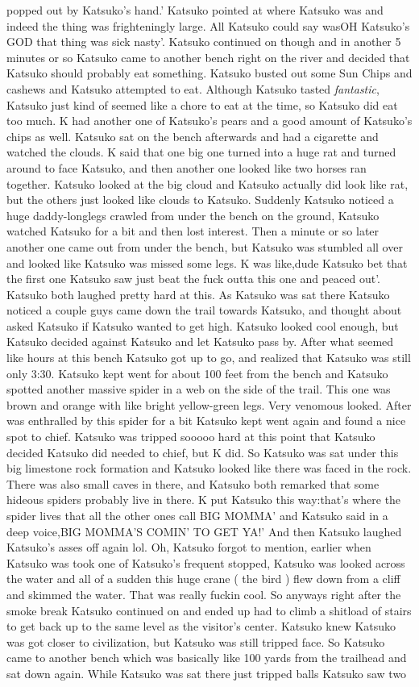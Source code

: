 \documentclass[12pt]{book}
\begin{document}
popped out by Katsuko's hand.' Katsuko pointed at where Katsuko was and indeed the thing was frighteningly large. All Katsuko could say wasOH Katsuko's GOD that thing was sick nasty'. Katsuko continued on though and in another 5 minutes or so Katsuko came to another bench right on the river and decided that Katsuko should probably eat something. Katsuko busted out some Sun Chips and cashews and Katsuko attempted to eat. Although Katsuko tasted \emph{fantastic}, Katsuko just kind of seemed like a chore to eat at the time, so Katsuko did eat too much. K had another one of Katsuko's pears and a good amount of Katsuko's chips as well. Katsuko sat on the bench afterwards and had a cigarette and watched the clouds. K said that one big one turned into a huge rat and turned around to face Katsuko, and then another one looked like two horses ran together. Katsuko looked at the big cloud and Katsuko actually did look like rat, but the others just looked like clouds to Katsuko. Suddenly Katsuko noticed a huge daddy-longlegs crawled from under the bench on the ground, Katsuko watched Katsuko for a bit and then lost interest. Then a minute or so later another one came out from under the bench, but Katsuko was stumbled all over and looked like Katsuko was missed some legs. K was like,dude Katsuko bet that the first one Katsuko saw just beat the fuck outta this one and peaced out'. Katsuko both laughed pretty hard at this. As Katsuko was sat there Katsuko noticed a couple guys came down the trail towards Katsuko, and thought about asked Katsuko if Katsuko wanted to get high. Katsuko looked cool enough, but Katsuko decided against Katsuko and let Katsuko pass by. After what seemed like hours at this bench Katsuko got up to go, and realized that Katsuko was still only 3:30. Katsuko kept went for about 100 feet from the bench and Katsuko spotted another massive spider in a web on the side of the trail. This one was brown and orange with like bright yellow-green legs. Very venomous looked. After was enthralled by this spider for a bit Katsuko kept went again and found a nice spot to chief. Katsuko was tripped sooooo hard at this point that Katsuko decided Katsuko did needed to chief, but K did. So Katsuko was sat under this big limestone rock formation and Katsuko looked like there was faced in the rock. There was also small caves in there, and Katsuko both remarked that some hideous spiders probably live in there. K put Katsuko this way:that's where the spider lives that all the other ones call BIG MOMMA' and Katsuko said in a deep voice,BIG MOMMA'S COMIN' TO GET YA!' And then Katsuko laughed Katsuko's asses off again lol. Oh, Katsuko forgot to mention, earlier when Katsuko was took one of Katsuko's frequent stopped, Katsuko was looked across the water and all of a sudden this huge crane ( the bird ) flew down from a cliff and skimmed the water. That was really fuckin cool. So anyways right after the smoke break Katsuko continued on and ended up had to climb a shitload of stairs to get back up to the same level as the visitor's center. Katsuko knew Katsuko was got closer to civilization, but Katsuko was still tripped face. So Katsuko came to another bench which was basically like 100 yards from the trailhead and sat down again. While Katsuko was sat there just tripped balls Katsuko saw two 
\end{document}
